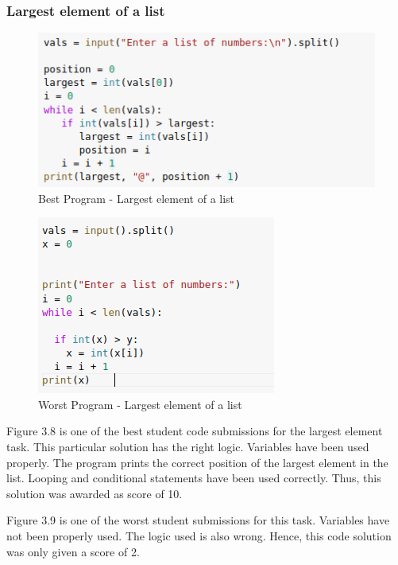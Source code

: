 \newpage

\subsubsection{Largest element of a list}

\begin{figure}[h]
\centering
\includegraphics{./figures/best_la.png}
\caption{Best Program - Largest element of a list}
\label{fig1}
\end{figure}

\begin{figure}[h]
\centering
\includegraphics{./figures/worst_la.png}
\caption{Worst Program - Largest element of a list}
\label{fig1}
\end{figure}

\newpage

Figure 3.8 is one of the best student code submissions for
the largest element task. This particular solution has the
right logic.  Variables have been used properly. The program
prints the correct position of the largest element in the
list. Looping and conditional statements have been used
correctly. Thus, this solution was awarded as score of 10.

Figure 3.9 is one of the worst student submissions for this
task. Variables have not been properly used. The logic used
is also wrong. Hence, this code solution was only given a
score of 2.

